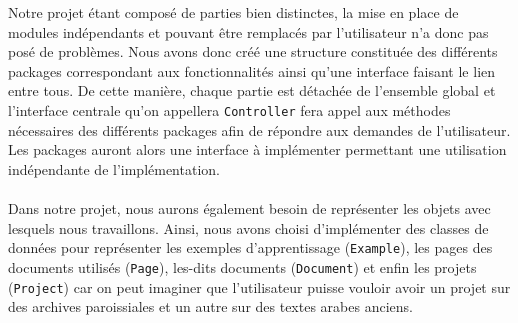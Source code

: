 Notre projet étant composé de parties bien distinctes, la mise en place de modules indépendants et pouvant être remplacés par l'utilisateur n'a donc pas posé de problèmes. Nous avons donc créé une structure constituée des différents packages correspondant aux fonctionnalités ainsi qu'une interface faisant le lien entre tous. De cette manière, chaque partie est détachée de l'ensemble global et l'interface centrale qu'on appellera \texttt{Controller} fera appel aux méthodes nécessaires des différents packages afin de répondre aux demandes de l'utilisateur. Les packages auront alors une interface à implémenter permettant une utilisation indépendante de l'implémentation.
\newpage
{}

\paragraph{}
Dans notre projet, nous aurons également besoin de représenter les objets avec lesquels nous travaillons. Ainsi, nous avons choisi d'implémenter des classes de données pour représenter les exemples d'apprentissage (\texttt{Example}), les pages des documents utilisés (\texttt{Page}), les-dits documents (\texttt{Document}) et enfin les projets (\texttt{Project}) car on peut imaginer que l'utilisateur puisse vouloir avoir un projet sur des archives paroissiales et un autre sur des textes arabes anciens.

